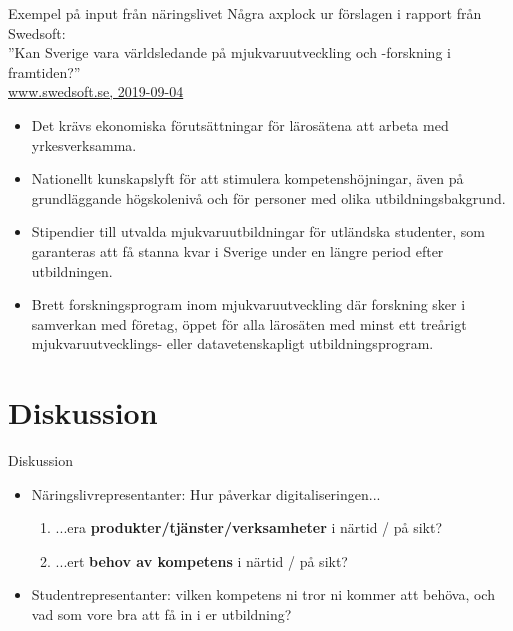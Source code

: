 \documentclass[aspectratio=169]{beamer}
\newcommand{\EndSlide}{\begin{frame}[plain]\endpage\end{frame}}
\newenvironment{Slide}[1]%
  {\begin{frame}[environment=Slide]{#1}}
  {\end{frame}}%
\begin{document}
\begin{Slide}{Exempel på input från näringslivet}
  Några axplock ur förslagen i rapport från Swedsoft: \\''Kan Sverige vara världsledande på mjukvaruutveckling och -forskning i framtiden?''\\
  \href{https://www.swedsoft.se/wp-content/uploads/sites/7/2019/09/Swedsoft-Helhetssyn-p\%C3\%A5-mjukvarans-betydelse-f\%C3\%B6r-digitalisering-och-konkurrenskraft.pdf}{www.swedsoft.se, 2019-09-04}
\begin{itemize}
  \item Det krävs ekonomiska förutsättningar för lärosätena att arbeta med yrkesverksamma.
  \item Nationellt kunskapslyft för att stimulera kompetenshöjningar, även på grundläggande högskolenivå och för personer med olika utbildningsbakgrund.
  \item Stipendier till utvalda mjukvaruutbildningar för utländska studenter, som garanteras att få stanna kvar i Sverige under en längre period efter utbildningen.
  \item Brett forskningsprogram inom mjukvaruutveckling där forskning sker i samverkan med företag, öppet för alla lärosäten med minst ett treårigt mjukvaruutvecklings- eller datavetenskapligt utbildningsprogram.
\end{itemize}
\end{Slide}





\section{Diskussion}

\begin{Slide}{Diskussion}
  \begin{itemize}
    \item Näringslivrepresentanter: Hur påverkar digitaliseringen...
    \begin{enumerate}
        \item  ...era \textbf{produkter/tjänster/verksamheter} i
        närtid / på sikt?
        
        \item ...ert \textbf{behov av kompetens} i närtid / på
        sikt?
    \end{enumerate}
    \item Studentrepresentanter: vilken kompetens ni tror ni kommer att behöva, och vad som vore bra att få in i er utbildning?
  \end{itemize}
\end{Slide}

\EndSlide
\end{document}

